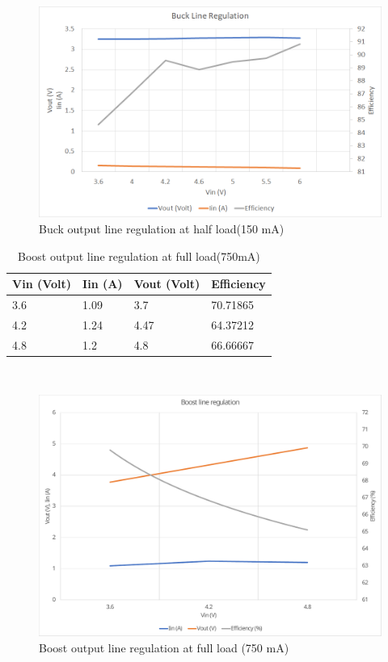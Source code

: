 \\
\begin{figure}[H]
	\centering
	\includegraphics[width=\columnwidth]{IMGS/Buck output line regulation at half load (150mA).png}
	\caption{Buck output line regulation at half load(150 mA)}
	\label{fig:arch}
\end{figure}
\pagebreak

\begin{table}[H]
\centering
\begin{tabular}{|l|l|l|l|}
\hline
Vin (Volt) & Iin (A) & Vout (Volt) & Efficiency \\ \hline
3.6        & 1.09    & 3.7         & 70.71865   \\ \hline
4.2        & 1.24    & 4.47        & 64.37212   \\ \hline
4.8        & 1.2     & 4.8         & 66.66667   \\ \hline
\end{tabular}
\caption{Boost output line regulation at full load(750mA)}
\label{table:4}
\end{table}
\\

\begin{figure}[H]
	\centering
	\includegraphics[width=\columnwidth]{IMGS/Boost output regulation at full load (750mA).pdf}
	\caption{Boost output line regulation at full load (750 mA)}
	\label{fig:arch}
\end{figure}
\pagebreak

